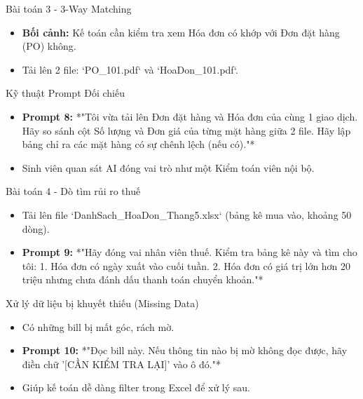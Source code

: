 \documentclass[aspectratio=169]{beamer}
\begin{document}
\begin{frame}{Bài toán 3 - 3-Way Matching}
    \begin{itemize}
        \item \textbf{Bối cảnh:} Kế toán cần kiểm tra xem Hóa đơn có khớp với Đơn đặt hàng (PO) không.
        \item Tải lên 2 file: `PO\_101.pdf` và `HoaDon\_101.pdf`.
    \end{itemize}
\end{frame}


\begin{frame}{Kỹ thuật Prompt Đối chiếu}
    \begin{itemize}
        \item \textbf{Prompt 8:} *"Tôi vừa tải lên Đơn đặt hàng và Hóa đơn của cùng 1 giao dịch. Hãy so sánh cột Số lượng và Đơn giá của từng mặt hàng giữa 2 file. Hãy lập bảng chỉ ra các mặt hàng có sự chênh lệch (nếu có)."*
        \item Sinh viên quan sát AI đóng vai trò như một Kiểm toán viên nội bộ.
    \end{itemize}
\end{frame}


\begin{frame}{Bài toán 4 - Dò tìm rủi ro thuế}
    \begin{itemize}
        \item Tải lên file `DanhSach\_HoaDon\_Thang5.xlsx` (bảng kê mua vào, khoảng 50 dòng).
        \item \textbf{Prompt 9:} *"Hãy đóng vai nhân viên thuế. Kiểm tra bảng kê này và tìm cho tôi: 1. Hóa đơn có ngày xuất vào cuối tuần. 2. Hóa đơn có giá trị lớn hơn 20 triệu nhưng chưa đánh dấu thanh toán chuyển khoản."*
    \end{itemize}
\end{frame}


\begin{frame}{Xử lý dữ liệu bị khuyết thiếu (Missing Data)}
    \begin{itemize}
        \item Có những bill bị mất góc, rách mờ.
        \item \textbf{Prompt 10:} *"Đọc bill này. Nếu thông tin nào bị mờ không đọc được, hãy điền chữ '[CẦN KIỂM TRA LẠI]' vào ô đó."*
        \item Giúp kế toán dễ dàng filter trong Excel để xử lý sau.
    \end{itemize}
\end{frame}
\end{document}
